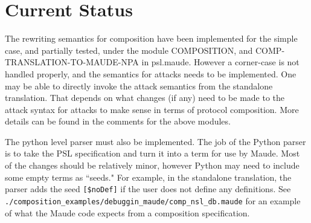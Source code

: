\documentclass{article}
\begin{document}
\section{Current Status}

The rewriting semantics for composition have been implemented for the simple case, and partially tested, under the module 
COMPOSITION, and COMP-TRANSLATION-TO-MAUDE-NPA in psl.maude. However a corner-case is not handled properly, and the semantics for
attacks needs to be implemented. One may be able to directly invoke the attack semantics from the standalone translation. That
depends on what changes (if any) need to be made to the attack syntax for attacks to make sense in terms of protocol composition. 
More details can be found in the comments for the above modules.

The python level parser must also be implemented. The job of the Python parser is to take the PSL specification and turn it into a 
term for use by Maude. Most of the changes should be relatively minor, however Python may need to include some empty terms as ``seeds."
For example, in the standalone translation, the parser adds the seed \verb|[$noDef]| if the user does not define any definitions.
See \verb|./composition_examples/debuggin_maude/comp_nsl_db.maude| for an example of what the Maude code expects from a composition
specification.
\end{document}
